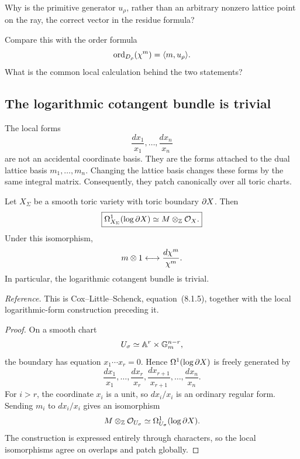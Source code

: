 \begin{pauseandthink}
Why is the primitive generator \(u_\rho\), rather than an arbitrary
nonzero lattice point on the ray, the correct vector in the residue
formula?

Compare this with the order formula
\[
\operatorname{ord}_{D_\rho}(\chi^{m})
=
\langle m,u_\rho\rangle.
\]
What is the common local calculation behind the two statements?
\end{pauseandthink}

\subsection{The logarithmic cotangent bundle is trivial}

The local forms
\[
\frac{dx_1}{x_1},\dots,\frac{dx_n}{x_n}
\]
are not an accidental coordinate basis. They are the forms attached
to the dual lattice basis \(m_1,\dots,m_n\). Changing the lattice
basis changes these forms by the same integral matrix. Consequently,
they patch canonically over all toric charts.

\begin{theorem}
\label{thm:logarithmic-cotangent-trivial-toric}
Let \(X_\Sigma\) be a smooth toric variety with toric boundary
\(\partial X\). Then
\[
\boxed{
\Omega^1_{X_\Sigma}(\log\partial X)
\simeq
M\otimes_{\mathbb{Z}}\mathcal{O}_X.
}
\]
Under this isomorphism,
\[
m\otimes1
\longleftrightarrow
\frac{d\chi^{m}}{\chi^{m}}.
\]
In particular, the logarithmic cotangent bundle is trivial.
\end{theorem}

\noindent
\textit{Reference.}
This is Cox--Little--Schenck, equation~(8.1.5), together with the
local logarithmic-form construction preceding it.

\begin{proof}
On a smooth chart
\[
U_\sigma\simeq\mathbb{A}^r\times\mathbb{G}_{m}^{n-r},
\]
the boundary has equation \(x_1\cdots x_r=0\). Hence
\(\Omega^1(\log\partial X)\) is freely generated by
\[
\frac{dx_1}{x_1},\dots,\frac{dx_r}{x_r},
\frac{dx_{r+1}}{x_{r+1}},\dots,
\frac{dx_n}{x_n}.
\]
For \(i>r\), the coordinate \(x_i\) is a unit, so
\(dx_i/x_i\) is an ordinary regular form. Sending \(m_i\) to
\(dx_i/x_i\) gives an isomorphism
\[
M\otimes_{\mathbb{Z}}\mathcal O_{U_\sigma}
\simeq
\Omega^1_{U_\sigma}(\log\partial X).
\]
The construction is expressed entirely through characters, so the
local isomorphisms agree on overlaps and patch globally.
\end{proof}

